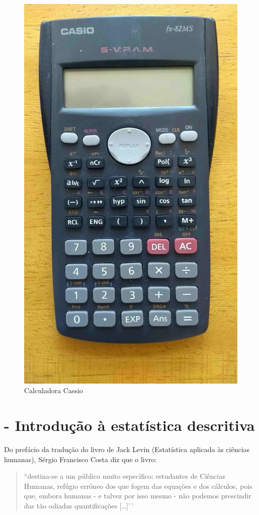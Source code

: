 \documentclass[
]{book}
\begin{document}
\begin{figure}

{\centering \includegraphics[width=0.8\linewidth]{images2/calculadora_cassio} 

}

\caption{Calculadora Cassio}\label{fig:unnamed-chunk-27}
\end{figure}

\hypertarget{descritiva}{%
\chapter{- Introdução à estatística descritiva}\label{descritiva}}

Do prefácio da tradução do livro de Jack Levin (Estatística aplicada às ciências humanas), Sérgio Francisco Costa diz que o livro:

\begin{quote}
``destina-se a um público muito específico: estudantes de Ciências Humanas, refúgio errôneo dos que fogem das equações e dos cálculos, pois que, embora humanas - e talvez por isso mesmo - não podemos prescindir das tão odiadas quantificações {[}\ldots{]}'\,'
\end{quote}
\end{document}
